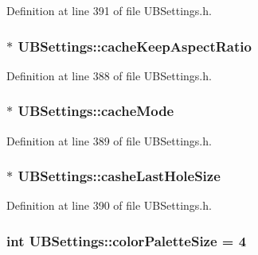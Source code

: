Definition at line 391 of file U\-B\-Settings.\-h.

\hypertarget{class_u_b_settings_a4ac160520db65a8179a1f23f3692bd39}{
\subsubsection[{cache\-Keep\-Aspect\-Ratio}]{$\ast$ U\-B\-Settings\-::cache\-Keep\-Aspect\-Ratio}}\label{db/d66/class_u_b_settings_a4ac160520db65a8179a1f23f3692bd39}


Definition at line 388 of file U\-B\-Settings.\-h.

\hypertarget{class_u_b_settings_ad55a1c27f720ce9ff548ef80d784ee03}{
\subsubsection[{cache\-Mode}]{$\ast$ U\-B\-Settings\-::cache\-Mode}}\label{db/d66/class_u_b_settings_ad55a1c27f720ce9ff548ef80d784ee03}


Definition at line 389 of file U\-B\-Settings.\-h.

\hypertarget{class_u_b_settings_a34d0e6aa27365de82ac42191d4faf9a6}{
\subsubsection[{cashe\-Last\-Hole\-Size}]{$\ast$ U\-B\-Settings\-::cashe\-Last\-Hole\-Size}}\label{db/d66/class_u_b_settings_a34d0e6aa27365de82ac42191d4faf9a6}


Definition at line 390 of file U\-B\-Settings.\-h.

\hypertarget{class_u_b_settings_aa2f5ce1902f84a0717c7322b0bb2af5d}{
\subsubsection[{color\-Palette\-Size}]{\setlength{\rightskip}{0pt plus 5cm}int U\-B\-Settings\-::color\-Palette\-Size = 4\hspace{0.3cm}{\ttfamily [static]}}}\label{db/d66/class_u_b_settings_aa2f5ce1902f84a0717c7322b0bb2af5d}


